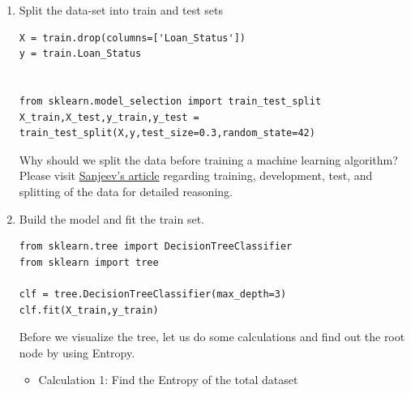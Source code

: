 \documentclass[a4paper,12pt]{article}
\begin{document}
\begin{enumerate}
\begin{enumerate}
\begin{lstlisting}
train['Gender']=train['Gender'].replace(to_replace='Male',value='1')
train['Gender']=train['Gender'].replace(to_replace='Female',value='0')


train['Married']=train['Married'].replace(to_replace='Yes',value='1')
train['Married']=train['Married'].replace(to_replace='No',value='0')


train['Self_Employed']=train['Self_Employed'].replace(to_replace='No',value='0')
train['Self_Employed']=train['Self_Employed'].replace(to_replace='Yes',value='1')


train['Education']=train['Education'].replace(to_replace='Graduate',value='1')
train['Education']=train['Education'].replace(to_replace='Not Graduate',value='0')
\end{lstlisting}

\item Split the data-set into train and test sets\\
\lstset{breaklines=true,language=Python,label= ,caption= ,captionpos=b,firstnumber=1,numbers=left}
\begin{lstlisting}
X = train.drop(columns=['Loan_Status'])
y = train.Loan_Status


from sklearn.model_selection import train_test_split
X_train,X_test,y_train,y_test = train_test_split(X,y,test_size=0.3,random_state=42)
\end{lstlisting}

Why should we split the data before training a machine learning algorithm?\\

Please visit \href{https://medium.com/@snji.khjuria/everything-you-need-to-know-about-train-dev-test-split-what-how-and-why-6ca17ea6f35}{Sanjeev’s article} regarding training, development, test, and splitting of the data for detailed reasoning.\\

\item Build the model and fit the train set.\\
\lstset{breaklines=true,language=Python,label= ,caption= ,captionpos=b,firstnumber=1,numbers=left}
\begin{lstlisting}
from sklearn.tree import DecisionTreeClassifier
from sklearn import tree

clf = tree.DecisionTreeClassifier(max_depth=3)
clf.fit(X_train,y_train)
\end{lstlisting}

Before we visualize the tree, let us do some calculations and find out the root node by using Entropy.\\
\begin{itemize}
\item Calculation 1: Find the Entropy of the total dataset\\


\end{itemize}
\end{enumerate}
\end{enumerate}
\end{document}
